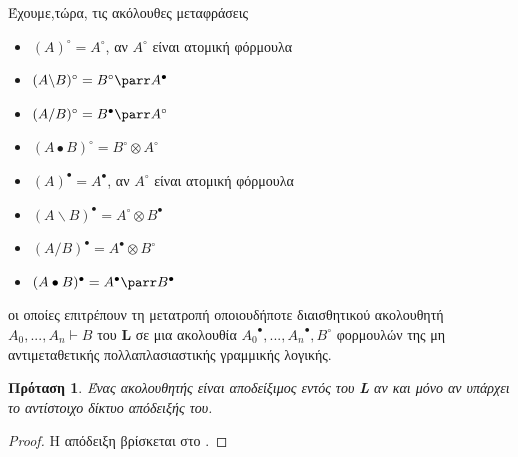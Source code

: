 \documentclass [a4paper,11pt] {book}
\newtheorem{proposition}[theorem]{Πρόταση}
\theoremstyle{definition}
\theoremstyle{definition}
\begin{document}
Έχουμε,τώρα, τις ακόλουθες μεταφράσεις
\begin{itemize}
\item $(A)^{\circ}=A^{\circ}$, αν $A^{\circ}$ είναι ατομική φόρμουλα
\item $(A\backslash B)^{\circ}=B^{\circ}\parr A^{\bullet}$
\item $(A/B)^{\circ}=B^{\bullet}\parr A^{\circ}$
\item $(A\bullet B)^{\circ}=B^{\circ}\otimes A^{\circ}$
\item $(A)^{\bullet}=A^{\bullet}$, αν $A^{\circ}$ είναι ατομική φόρμουλα
\item $(A\backslash B)^{\bullet}=A^{\circ}\otimes B^{\bullet}$
\item $(A/B)^{\bullet}=A^{\bullet}\otimes B^{\circ}$
\item $(A\bullet B)^{\bullet}=A^{\bullet}\parr B^{\bullet}$
\end{itemize}
οι οποίες επιτρέπουν τη μετατροπή οποιουδήποτε διαισθητικού ακολουθητή $A_{0},...,A_{n}\vdash B$ του \textbf{L} σε μια ακολουθία ${A_{0}}^{\bullet},...,{A_{n}}^{\bullet},B^{\circ}$ φορμουλών της μη αντιμεταθετικής πολλαπλασιαστικής γραμμικής λογικής.
\begin{proposition}
Ένας ακολουθητής είναι αποδείξιμος εντός του \textbf{L} αν και μόνο αν υπάρχει το αντίστοιχο δίκτυο απόδειξής του.
\end{proposition}
\begin{proof}
Η απόδειξη βρίσκεται στο \citep{Bechet96constructingdifferent}.
\end{proof}
\end{document}
